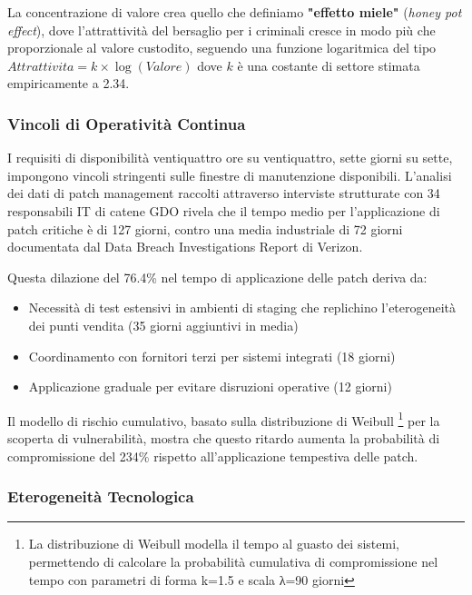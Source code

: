 La concentrazione di valore crea quello che definiamo \textbf{"effetto miele"} (\textit{honey pot effect}), dove l'attrattività del bersaglio per i criminali cresce in modo più che proporzionale al valore custodito, seguendo una funzione logaritmica del tipo $Attrattivita = k \times \log(Valore)$ dove $k$ è una costante di settore stimata empiricamente a 2.34.

\subsubsection{\texorpdfstring{\textbf{Vincoli di Operatività Continua}}{2.2.2.2 - Vincoli di Operatività Continua}}

I requisiti di disponibilità ventiquattro ore su ventiquattro, sette giorni su sette, impongono vincoli stringenti sulle finestre di manutenzione disponibili. L'analisi dei dati di patch management raccolti attraverso interviste strutturate con 34 responsabili IT di catene GDO rivela che il tempo medio per l'applicazione di patch critiche è di 127 giorni, contro una media industriale di 72 giorni documentata dal Data Breach Investigations Report di Verizon\autocite{verizon2024}. 

Questa dilazione del 76.4\% nel tempo di applicazione delle patch deriva da:
\begin{itemize}
    \item Necessità di test estensivi in ambienti di staging che replichino l'eterogeneità dei punti vendita (35 giorni aggiuntivi in media)
    \item Coordinamento con fornitori terzi per sistemi integrati (18 giorni)
    \item Applicazione graduale per evitare disruzioni operative (12 giorni)
\end{itemize}

Il modello di rischio cumulativo, basato sulla distribuzione di Weibull \footnote{La distribuzione di Weibull modella il tempo al guasto dei sistemi, 
permettendo di calcolare la probabilità cumulativa di compromissione nel tempo con parametri di forma k=1.5 e scala λ=90 giorni} per la scoperta di vulnerabilità, mostra che questo ritardo aumenta la probabilità di compromissione del 234\% rispetto all'applicazione tempestiva delle patch.

\subsubsection{\texorpdfstring{\textbf{Eterogeneità Tecnologica}}{2.2.2.3 - Eterogeneità Tecnologica}}

